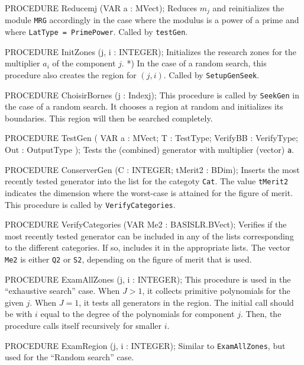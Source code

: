 PROCEDURE Reducemj (VAR a : MVect);
\endcode
 \tab
  Reduces $m_j$ and reinitializes the module {\tt MRG} accordingly
  in the case where the modulus is a power of a prime and where
  {\tt LatType = PrimePower}.  Called by {\tt testGen}.
 \endtab
\code

PROCEDURE InitZones (j, i : INTEGER);
\endcode
 \tab
  Initializes the research zones for the multiplier $a_i$ of the
  component $j$.                                              *)
  In the case of a random search, this procedure also creates the
  region for $(j,i)$.    Called by {\tt SetupGenSeek}.
 \endtab
\code

PROCEDURE ChoisirBornes (j : Indexj);
\endcode
  \tab  This procedure is called by {\tt SeekGen} in the case of a
    random search.  It chooses a region at random and 
    initializes its boundaries.  This region will then be searched
    completely.  
  \endtab
\code

PROCEDURE TestGen
   ( VAR a    : MVect;
     T        : TestType;
     VerifyBB : VerifyType;
     Out      : OutputType
   );
\endcode
 \tab
   Tests the (combined) generator with multiplier (vector) {\tt a}.
 \endtab
\code

PROCEDURE ConserverGen (C : INTEGER;  tMerit2 : BDim);
\endcode
 \tab
   Inserts the most recently tested generator into the list
   for the categoty {\tt Cat}.
   The value {\tt tMerit2} indicates the dimension where the
   worst-case is attained for the figure of merit.
   This procedure is called by {\tt VerifyCategories}.
 \endtab
\code

PROCEDURE VerifyCategories (VAR Me2 : BASISLR.BVect);
\endcode
 \tab
  Verifies if the most recently tested generator can be included
  in any of the lists corresponding to the different categories.
  If so, includes it in the appropriate lists. 
  The vector {\tt Me2} is either {\tt Q2} or {\tt S2}, depending
  on the figure of merit that is used.
 \endtab
\code

PROCEDURE ExamAllZones (j, i : INTEGER);
\endcode
 \tab
  This procedure is used in the ``exhaustive search'' case. 
  When $J > 1$, it collects primitive polynomials for the given $j$.
  When $J = 1$, it tests all generators in the region.
  The initial call should be with $i$ equal to the degree of the
  polynomials for component $j$.
  Then, the procedure calls itself recursively for smaller $i$.
 \endtab
\code

PROCEDURE ExamRegion (j, i : INTEGER);
\endcode
 \tab
  Similar to {\tt ExamAllZones}, but used for the ``Random search'' case.
 \endtab
\code


